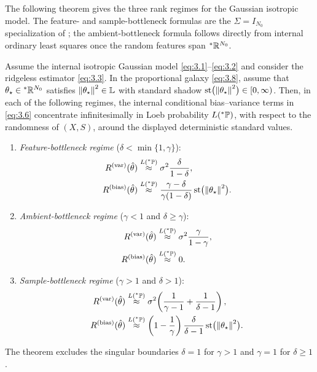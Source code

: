 The following theorem gives the three rank regimes for the Gaussian isotropic model. The feature- and sample-bottleneck formulas are the $\Sigma = I_{N_0}$ specialization of \cite[Proposition~4]{bach2024high}; the ambient-bottleneck formula follows directly from internal ordinary least squares once the random features span ${}^*\mathbb{R}^{N_0}$.

\begin{theorem}\label{thm:3.1}
Assume the internal isotropic Gaussian model \eqref{eq:3.1}--\eqref{eq:3.2} and consider the ridgeless estimator \eqref{eq:3.3}. In the proportional galaxy \eqref{eq:3.8}, assume that $\theta_\star \in {}^*\mathbb{R}^{N_0}$ satisfies $\left\lVert \theta_\star \right\rVert^2 \in \mathbb{L}$ with standard shadow $\operatorname{st}\bigl(\left\lVert \theta_\star \right\rVert^2\bigr) \in [0, \infty)$. Then, in each of the following regimes, the internal conditional bias--variance terms in \eqref{eq:3.6} concentrate infinitesimally in Loeb probability $L({}^*\mathbb{P})$, with respect to the randomness of $(X, S)$, around the displayed deterministic standard values.
\begin{enumerate}[label=(\alph*)]
\item \emph{Feature-bottleneck regime} ($\delta < \min\{1, \gamma\}$):
\begin{align}
R^{(\mathrm{var})}(\hat{\theta}) &\stackrel{L({}^*\mathbb{P})}{\approx} \sigma^2 \frac{\delta}{1 - \delta}, \label{eq:3.9} \\
R^{(\mathrm{bias})}(\hat{\theta}) &\stackrel{L({}^*\mathbb{P})}{\approx} \frac{\gamma - \delta}{\gamma(1 - \delta)} \operatorname{st}\bigl(\left\lVert \theta_\star \right\rVert^2\bigr). \label{eq:3.10}
\end{align}

\item \emph{Ambient-bottleneck regime} ($\gamma < 1$ and $\delta \ge \gamma$):
\begin{align}
R^{(\mathrm{var})}(\hat{\theta}) &\stackrel{L({}^*\mathbb{P})}{\approx} \sigma^2 \frac{\gamma}{1 - \gamma}, \label{eq:3.11} \\
R^{(\mathrm{bias})}(\hat{\theta}) &\stackrel{L({}^*\mathbb{P})}{\approx} 0. \label{eq:3.12}
\end{align}

\item \emph{Sample-bottleneck regime} ($\gamma > 1$ and $\delta > 1$):
\begin{align}
R^{(\mathrm{var})}(\hat{\theta}) &\stackrel{L({}^*\mathbb{P})}{\approx} \sigma^2\!\left(\frac{1}{\gamma - 1} + \frac{1}{\delta - 1}\right), \label{eq:3.13} \\
R^{(\mathrm{bias})}(\hat{\theta}) &\stackrel{L({}^*\mathbb{P})}{\approx} \left(1 - \frac{1}{\gamma}\right)\frac{\delta}{\delta - 1} \operatorname{st}\bigl(\left\lVert \theta_\star \right\rVert^2\bigr). \label{eq:3.14}
\end{align}
\end{enumerate}
The theorem excludes the singular boundaries $\delta = 1$ for $\gamma > 1$ and $\gamma = 1$ for $\delta \ge 1$.
\end{theorem}

